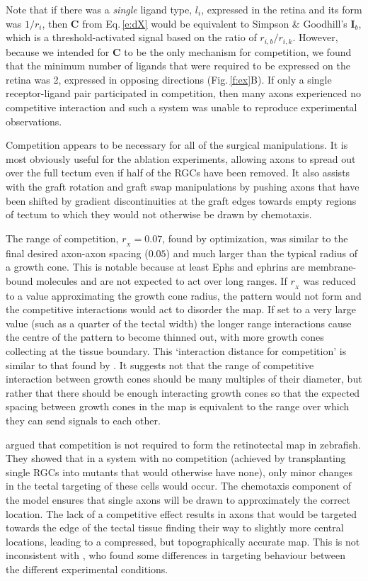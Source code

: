 \documentclass[9pt,lineno,draft]{elife}
\begin{document}
Note that if there was a \emph{single} ligand type, $l_i$, expressed in the retina and its form was $1/r_i$, then $\mathbf{C}$ from Eq.\,\ref{e:dX} would be equivalent to Simpson \& Goodhill's $\mathbf{I}_b$, which is a threshold-activated signal based on the ratio of $r_{i,b}/r_{i,k}$.
However, because we intended for $\mathbf{C}$ to be the only mechanism for competition, we found that the minimum number of ligands that were required to be expressed on the retina was 2, expressed in opposing directions (Fig.\,\ref{f:ex}B). If only a single receptor-ligand pair participated in competition, then many axons experienced no competitive interaction and such a system was unable to reproduce experimental observations.

Competition appears to be necessary for all of the surgical manipulations.
It is most obviously useful for the ablation experiments, allowing axons to spread out over the full tectum even if half of the RGCs have been removed.
It also assists with the graft rotation and graft swap manipulations by pushing axons that have been shifted by gradient discontinuities at the graft edges towards empty regions of tectum to which they would not otherwise be drawn by chemotaxis.

The range of competition, $r_{\!_X}=0.07$, found by optimization, was similar to the final desired axon-axon spacing ($0.05$) and much larger than the typical radius of a growth cone. This is notable because at least Ephs and ephrins are membrane-bound molecules \citep{cang_developmental_2013} and are not expected to act over long ranges.
If $r_{\!_X}$ was reduced to a value approximating the growth cone radius, the pattern would not form and the competitive interactions would act to disorder the map.
If set to a very large value (such as a quarter of the tectal width) the longer range interactions cause the centre of the pattern to become thinned out, with more growth cones collecting at the tissue boundary.
This `interaction distance for competition' is similar to that found by \citet{simpson_simple_2011}.
It suggests not that the range of competitive interaction between growth cones should be many multiples of their diameter, but rather that there should be enough interacting growth cones so that the expected spacing between growth cones in the map is equivalent to the range over which they can send signals to each other.

\citet{gosse_retinotopic_2008} argued that competition is not required to form the retinotectal map in zebrafish. They showed that in a system with no competition (achieved by transplanting single RGCs into mutants that would otherwise have none), only minor changes in the tectal targeting of these cells would occur.
The chemotaxis component of the model ensures that single axons will be drawn to approximately the correct location.
The lack of a competitive effect results in axons that would be targeted towards the edge of the tectal tissue finding their way to slightly more central locations, leading to a compressed, but topographically accurate map.
This is not inconsistent with \citet{gosse_retinotopic_2008}, who found some differences in targeting behaviour between the different experimental conditions.
\end{document}
